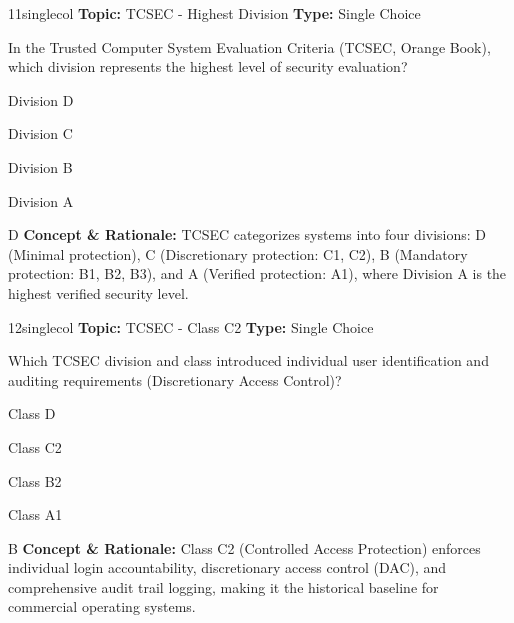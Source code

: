 \begin{qcard}{11}{singlecol}
\textcolor{darkslate!75}{\small\textbf{Topic:} TCSEC - Highest Division \hfill \textbf{Type:} Single Choice}\vspace{0.4em}\par
In the Trusted Computer System Evaluation Criteria (TCSEC, Orange Book), which division represents the highest level of security evaluation?
\begin{qoptions}
\item Division D
\item Division C
\item Division B
\item Division A
\end{qoptions}
\end{qcard}
\nopagebreak
\begin{explainbox}{D}
\textbf{Concept \& Rationale:} TCSEC categorizes systems into four divisions: D (Minimal protection), C (Discretionary protection: C1, C2), B (Mandatory protection: B1, B2, B3), and A (Verified protection: A1), where Division A is the highest verified security level.
\end{explainbox}

\begin{qcard}{12}{singlecol}
\textcolor{darkslate!75}{\small\textbf{Topic:} TCSEC - Class C2 \hfill \textbf{Type:} Single Choice}\vspace{0.4em}\par
Which TCSEC division and class introduced individual user identification and auditing requirements (Discretionary Access Control)?
\begin{qoptions}
\item Class D
\item Class C2
\item Class B2
\item Class A1
\end{qoptions}
\end{qcard}
\nopagebreak
\begin{explainbox}{B}
\textbf{Concept \& Rationale:} Class C2 (Controlled Access Protection) enforces individual login accountability, discretionary access control (DAC), and comprehensive audit trail logging, making it the historical baseline for commercial operating systems.
\end{explainbox}


